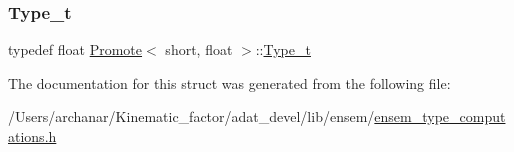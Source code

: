 \subsubsection{\texorpdfstring{Type\_t}{Type\_t}\hspace{0.1cm}{\footnotesize\ttfamily [2/2]}}
{\footnotesize\ttfamily typedef float \mbox{\hyperlink{structPromote}{Promote}}$<$ short, float $>$\+::\mbox{\hyperlink{structPromote_3_01short_00_01float_01_4_a6c280bd9d625add9fbe42ad7517e59d7}{Type\+\_\+t}}}



The documentation for this struct was generated from the following file\+:\begin{DoxyCompactItemize}
\item 
/\+Users/archanar/\+Kinematic\+\_\+factor/adat\+\_\+devel/lib/ensem/\mbox{\hyperlink{lib_2ensem_2ensem__type__computations_8h}{ensem\+\_\+type\+\_\+computations.\+h}}\end{DoxyCompactItemize}
